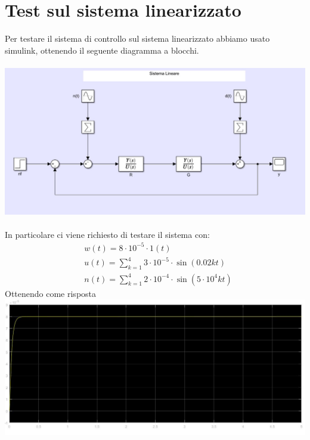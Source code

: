 \section{Test sul sistema linearizzato}

    Per testare il sistema di controllo sul sistema linearizzato abbiamo usato simulink, 
    ottenendo il seguente diagramma a blocchi.\\\\
    \includegraphics[scale=0.5]{immagini/diaglin.jpg}\\\\
    In particolare ci viene richiesto di testare il sistema con:
    \begin{align*}
        &w(t)=8  \cdot 10^{-5 }\cdot 1(t)\\
        &u(t)=\sum_{k=1}^4 3 \cdot 10^{-5} \cdot \sin(0.02kt)\\
        &n(t)=\sum_{k=1}^4 2 \cdot 10^{-4} \cdot \sin(5 \cdot 10^{4} kt)
    \end{align*}
    Ottenendo come risposta \\
    \includegraphics[scale=0.4]{immagini/risplin.jpg}